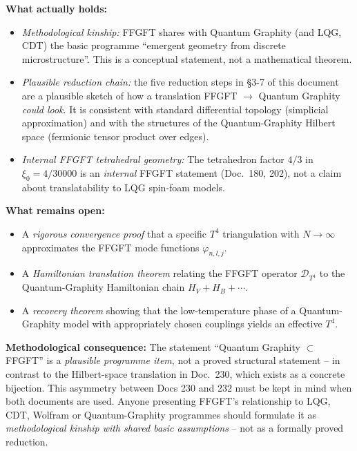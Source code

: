 \textbf{What actually holds:}
\begin{itemize}[leftmargin=2em,itemsep=2pt,topsep=2pt]
  \item \emph{Methodological kinship:} FFGFT shares with Quantum
        Graphity (and LQG, CDT) the basic programme \enquote{emergent
        geometry from discrete microstructure}. This is a conceptual
        statement, not a mathematical theorem.
  \item \emph{Plausible reduction chain:} the five reduction steps
        in §3-7 of this document are a plausible sketch of how a
        translation FFGFT $\to$ Quantum Graphity \emph{could look}.
        It is consistent with standard differential topology
        (simplicial approximation) and with the structures of the
        Quantum-Graphity Hilbert space (fermionic tensor product
        over edges).
  \item \emph{Internal FFGFT tetrahedral geometry:} The tetrahedron
        factor $4/3$ in $\xi_0 = 4/30000$ is an \emph{internal}
        FFGFT statement (Doc.~180, 202), not a claim about
        translatability to LQG spin-foam models.
\end{itemize}

\textbf{What remains open:}
\begin{itemize}[leftmargin=2em,itemsep=2pt,topsep=2pt]
  \item A \emph{rigorous convergence proof} that a specific $T^4$
        triangulation with $N \to \infty$ approximates the FFGFT
        mode functions $\varphi_{n,l,j}$.
  \item A \emph{Hamiltonian translation theorem} relating the FFGFT
        operator $\mathcal{D}_{T^4}$ to the Quantum-Graphity
        Hamiltonian chain $H_V + H_B + \cdots$.
  \item A \emph{recovery theorem} showing that the low-temperature
        phase of a Quantum-Graphity model with appropriately chosen
        couplings yields an effective $T^4$.
\end{itemize}

\textbf{Methodological consequence:} The statement \enquote{Quantum
Graphity $\subset$ FFGFT} is a \emph{plausible programme item}, not
a proved structural statement -- in contrast to the Hilbert-space
translation in Doc.~230, which exists as a concrete bijection.
This asymmetry between Docs 230 and 232 must be kept in mind when
both documents are used. Anyone presenting FFGFT's relationship to
LQG, CDT, Wolfram or Quantum-Graphity programmes should formulate
it as \emph{methodological kinship with shared basic assumptions} --
not as a formally proved reduction.

